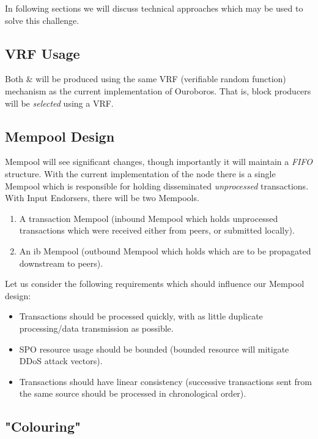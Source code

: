\documentclass[11pt,a4paper]{article}
\begin{document}
In following sections we will discuss technical approaches which may be used to solve this challenge.

\subsection{VRF Usage}
Both  \&  will be produced using the same VRF (verifiable random function) mechanism 
as the current implementation of Ouroboros. That is, block producers will be \emph{selected} using a VRF. 




\subsection{Mempool Design}
Mempool will see significant changes, though importantly it will maintain a \emph{FIFO} structure.
With the current implementation of the node there is a single Mempool which is responsible for
holding disseminated \emph{unprocessed} transactions. With Input Endorsers, there will be two Mempools.

\begin{enumerate}
  \item A transaction Mempool (inbound Mempool which holds unprocessed transactions which were received either from peers, or submitted locally).
  \item An \gls{ib} Mempool (outbound Mempool which holds  which are to be propagated downstream to peers).
\end{enumerate}

Let us consider the following requirements which should influence our Mempool design:

\begin{itemize}
  \item Transactions should be processed quickly, with as little duplicate processing/data transmission as possible.
  \item SPO resource usage should be bounded (bounded resource will mitigate DDoS attack vectors).
  \item Transactions should have linear consistency (successive transactions sent from the same source should be processed in chronological order).
\end{itemize}


\subsection{"Colouring"}
\end{document}
